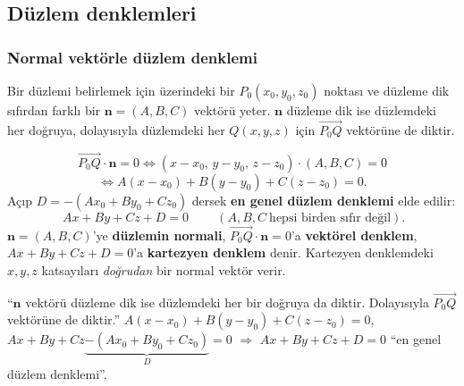 \subsection{Düzlem denklemleri}

\subsubsection{Normal vektörle düzlem denklemi}

Bir düzlemi belirlemek için üzerindeki bir $P_0(x_0,y_0,z_0)$ noktası ve düzleme dik sıfırdan farklı bir $\mathbf n=(A,B,C)$ vektörü yeter. $\mathbf n$ düzleme dik ise düzlemdeki her doğruya, dolayısıyla düzlemdeki her $Q(x,y,z)$ için $\overrightarrow{P_0Q}$ vektörüne de diktir.

\begin{center}
\end{center}

\begin{teorem}
\[ \overrightarrow{P_0Q}\cdot\mathbf n=0\iff (x-x_0,\,y-y_0,\,z-z_0)\cdot(A,B,C)=0 \]
\[ \iff A(x-x_0)+B(y-y_0)+C(z-z_0)=0 . \]
Açıp $D=-(Ax_0+By_0+Cz_0)$ dersek \textbf{en genel düzlem denklemi} elde edilir:
\[ \boxed{\ Ax+By+Cz+D=0\ }\qquad(A,B,C\ \text{hepsi birden sıfır değil}). \]
$\mathbf n=(A,B,C)$'ye \textbf{düzlemin normali}, $\overrightarrow{P_0Q}\cdot\mathbf n=0$'a \textbf{vektörel denklem}, $Ax+By+Cz+D=0$'a \textbf{kartezyen denklem} denir. Kartezyen denklemdeki $x,y,z$ katsayıları \emph{doğrudan} bir normal vektör verir.
\end{teorem}

\begin{tahta}
``$\mathbf n$ vektörü düzleme dik ise düzlemdeki her bir doğruya da diktir. Dolayısıyla $\overrightarrow{P_0Q}$ vektörüne de diktir.''
$A(x-x_0)+B(y-y_0)+C(z-z_0)=0$, $Ax+By+Cz\underbrace{-(Ax_0+By_0+Cz_0)}_{D}=0$ $\Rightarrow$ $\boxed{Ax+By+Cz+D=0}$ ``en genel düzlem denklemi''.
\end{tahta}

